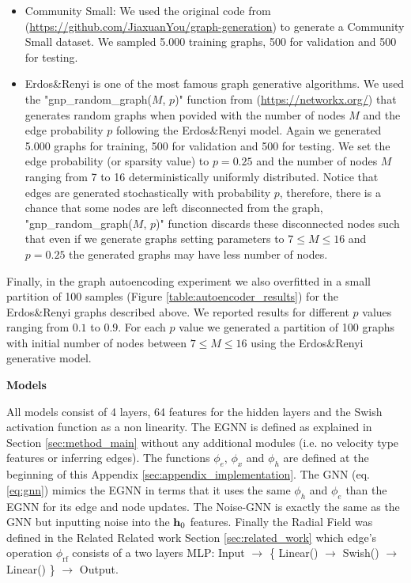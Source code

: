 \begin{itemize}
    \item Community Small: We used the original code from \cite{you2018graphrnn} (\hyperlink{https://github.com/JiaxuanYou/graph-generation}{https://github.com/JiaxuanYou/graph-generation}) to generate a Community Small dataset. We sampled 5.000 training graphs, 500 for validation and 500 for testing.
    \item Erdos\&Renyi is one of the most famous graph generative algorithms. We used the "gnp\_random\_graph($M$, $p$)" function from (\hyperlink{https://networkx.org/}{https://networkx.org/}) that generates random graphs when povided with the number of nodes $M$ and the edge probability $p$ following the Erdos\&Renyi model. Again we generated 5.000 graphs for training, 500 for validation and 500 for testing. We set the edge probability (or sparsity value) to $p=0.25$ and the number of nodes $M$ ranging from 7 to 16 deterministically uniformly  distributed. Notice that edges are generated stochastically with probability $p$, therefore, there is a chance that some nodes are left disconnected from the graph, "gnp\_random\_graph($M$, $p$)" function discards these disconnected nodes such that even if we generate graphs setting parameters to $7 \leq M \leq 16$ and $p=0.25$ the generated graphs may have less number of nodes. \end{itemize}
    
Finally, in the graph autoencoding experiment we also overfitted in a small partition of 100 samples (Figure \ref{table:autoencoder_results}) for the Erdos\&Renyi graphs described above. We reported results for different $p$ values ranging from $0.1$ to $0.9$. For each $p$ value we generated a partition of 100 graphs with initial number of nodes between $7 \leq M \leq 16$ using the Erdos\&Renyi generative model.

\textbf{Models}

All models consist of 4 layers, 64 features for the hidden layers and the Swish activation function as a non linearity. The EGNN is defined as explained in Section \ref{sec:method_main} without any additional modules (i.e. no velocity type features or inferring edges). The functions $\phi_e$, $\phi_x$ and $\phi_h$ are defined at the beginning of this Appendix \ref{sec:appendix_implementation}. The GNN (eq. \ref{eq:gnn}) mimics the EGNN in terms that it uses the same $\phi_h$ and $\phi_e$ than the EGNN for its edge and node updates. The Noise-GNN is exactly the same as the GNN but inputting noise into the $\mathbf{h}_0$ features. Finally the Radial Field was defined in the Related Related work Section \ref{sec:related_work} which edge's operation $\phi_{\mathrm{rf}}$ consists of a two layers MLP: Input $\xrightarrow{}$ \{ Linear() $\xrightarrow{}$ Swish() $\xrightarrow{}$ Linear() \} $\xrightarrow{}$ Output.


